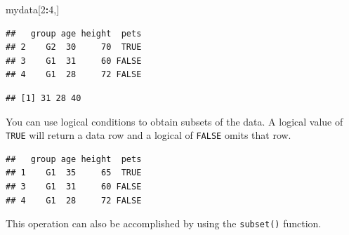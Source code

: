 \documentclass[
]{book}
\newenvironment{Shaded}{\begin{snugshade}}{\end{snugshade}}
\newcommand{\DecValTok}[1]{\textcolor[rgb]{0.00,0.00,0.81}{#1}}
\newcommand{\KeywordTok}[1]{\textcolor[rgb]{0.13,0.29,0.53}{\textbf{#1}}}
\newcommand{\NormalTok}[1]{#1}
\newcommand{\OperatorTok}[1]{\textcolor[rgb]{0.81,0.36,0.00}{\textbf{#1}}}
\newcommand{\StringTok}[1]{\textcolor[rgb]{0.31,0.60,0.02}{#1}}
\begin{document}
\begin{Shaded}
\begin{Highlighting}[]
\NormalTok{mydata[}\DecValTok{2}\OperatorTok{:}\DecValTok{4}\NormalTok{,]}
\end{Highlighting}
\end{Shaded}

\begin{verbatim}
##   group age height  pets
## 2    G2  30     70  TRUE
## 3    G1  31     60 FALSE
## 4    G1  28     72 FALSE
\end{verbatim}

\begin{Shaded}
\end{Shaded}

\begin{verbatim}
## [1] 31 28 40
\end{verbatim}

You can use logical conditions to obtain subsets of the data. A logical value of \texttt{TRUE} will return a data row and a logical of \texttt{FALSE} omits that row.

\begin{Shaded}
\end{Shaded}

\begin{verbatim}
##   group age height  pets
## 1    G1  35     65  TRUE
## 3    G1  31     60 FALSE
## 4    G1  28     72 FALSE
\end{verbatim}

This operation can also be accomplished by using the \texttt{subset()} function.

\begin{Shaded}
\end{Shaded}
\end{document}
